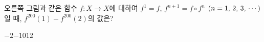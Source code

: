 \hspace*{2mm}\begin{minipage}[t]{\dimexpr\linewidth-2mm\relax}\vspace{0pt}
\noindent\begin{minipage}[t]{0.58\linewidth}\vspace{0pt}\raggedright 오른쪽 그림과 같은 함수 $f:X\longrightarrow X$에 대하여 $f^1=f$, $f^{n+1}=f\circ f^n$ $(n=1,\mkern3mu 2,\mkern3mu 3,\mkern3mu \cdots)$일 때, $f^{200}(1)-f^{200}(2)$의 값은?\end{minipage}\hfill\begin{minipage}[t]{0.4\linewidth}\vspace{0pt}\centering \resizebox{\ifdim\width>\linewidth\linewidth\else\width\fi}{!}{}\end{minipage}\par
\begin{choices32}{$-2$}{$-1$}{$0$}{$1$}{$2$}\end{choices32}\end{minipage}
